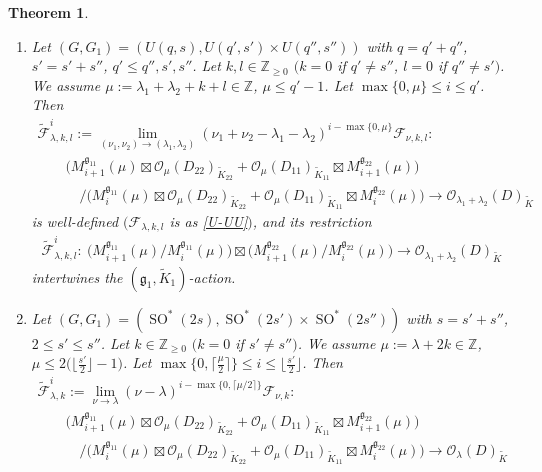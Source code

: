 \documentclass[pdftex]{sigma}
\numberwithin{equation}{section}
\newtheorem{Theorem}{Theorem}[section]
\newcommand{\BZ}{\mathbb{Z}}
\newcommand{\fg}{\mathfrak{g}}
\newcommand{\cF}{\mathcal{F}}
\newcommand{\cO}{\mathcal{O}}
\begin{document}
\begin{Theorem}
\begin{enumerate}
\begin{alignat*}{3}
\end{alignat*}
intertwine the $(\fg_1,\tilde{K}_1)$-action.
\item[$(2)$] Let $(G,G_1)=(U(q,s),U(q',s')\times U(q'',s''))$ with $q=q'+q''$, $s'=s'+s''$, $q'\le q'',s',s''$.
Let $k,l\in\BZ_{\ge 0}$ $(k=0$ if $q'\ne s''$, $l=0$ if $q''\ne s')$.
We assume $\mu:=\lambda_1+\lambda_2+k+l\in\BZ$, $\mu\le q'-1$. Let $\max\{0,\mu\}\le i\le q'$. Then
\begin{gather*}
 \tilde{\cF}_{\lambda,k,l}^i:=\lim_{(\nu_1,\nu_2)\to(\lambda_1,\lambda_2)} (\nu_1+\nu_2-\lambda_1-\lambda_2)^{i-\max\{0,\mu\}}\cF_{\nu,k,l} \colon\\
 \qquad{} \big(M_{i+1}^{\fg_{11}}(\mu)\boxtimes \cO_\mu(D_{22})_{\tilde{K}_{22}}+\cO_\mu(D_{11})_{\tilde{K}_{11}}\boxtimes M_{i+1}^{\fg_{22}}(\mu)\big) \\
\qquad\quad {} /\big(M_i^{\fg_{11}}(\mu)\boxtimes \cO_\mu(D_{22})_{\tilde{K}_{22}}+\cO_\mu(D_{11})_{\tilde{K}_{11}}\boxtimes M_i^{\fg_{22}}(\mu)\big)
\longrightarrow \cO_{\lambda_1+\lambda_2}(D)_{\tilde{K}}
\end{gather*}
is well-defined $(\cF_{\lambda,k,l}$ is as \eqref{U-UU}$)$, and its restriction
\begin{gather*} \tilde{\cF}_{\lambda,k,l}^i\colon \ \big(M_{i+1}^{\fg_{11}}(\mu)/M_i^{\fg_{11}}(\mu)\big)\boxtimes \big(M_{i+1}^{\fg_{22}}(\mu)/M_i^{\fg_{22}}(\mu)\big)
\longrightarrow \cO_{\lambda_1+\lambda_2}(D)_{\tilde{K}} \end{gather*}
intertwines the $(\fg_1,\tilde{K}_1)$-action.
\item[$(3)$] Let $(G,G_1)=(\operatorname{SO}^*(2s),\operatorname{SO}^*(2s')\times \operatorname{SO}^*(2s''))$ with $s=s'+s''$, $2\le s'\le s''$.
Let $k\in\BZ_{\ge 0}$ $(k=0$ if $s'\ne s'')$.
We assume $\mu:=\lambda+2k\in\BZ$, $\mu\le 2\big(\big\lfloor\frac{s'}{2}\big\rfloor-1\big)$. Let $\max\big\{0,\big\lceil\frac{\mu}{2}\big\rceil\big\}\le i\le \big\lfloor\frac{s'}{2}\big\rfloor$. Then
\begin{gather*}
 \tilde{\cF}_{\lambda,k}^i:=\lim_{\nu\to\lambda} (\nu-\lambda)^{i-\max\{0,\lceil\mu/2\rceil\}}\cF_{\nu,k}\colon \\
 \qquad {} \big(M_{i+1}^{\fg_{11}}(\mu)\boxtimes \cO_\mu(D_{22})_{\tilde{K}_{22}}+\cO_\mu(D_{11})_{\tilde{K}_{11}}\boxtimes M_{i+1}^{\fg_{22}}(\mu)\big) \\
\qquad \quad {} /\big(M_i^{\fg_{11}}(\mu)\boxtimes \cO_\mu(D_{22})_{\tilde{K}_{22}}+\cO_\mu(D_{11})_{\tilde{K}_{11}}\boxtimes M_i^{\fg_{22}}(\mu)\big)
\longrightarrow \cO_\lambda(D)_{\tilde{K}}

\end{gather*}
\end{enumerate}
\end{Theorem}
\end{document}
